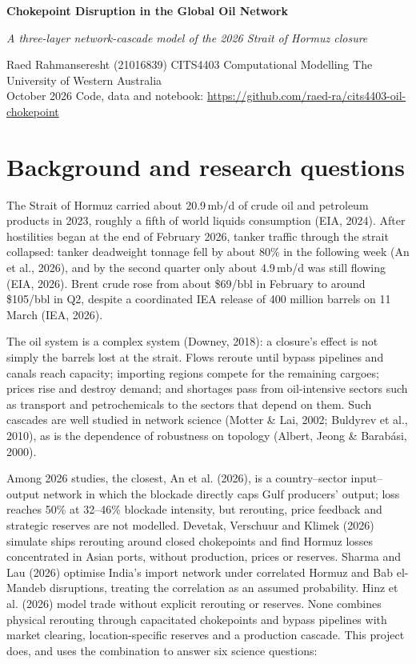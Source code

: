 \documentclass[11pt,a4paper]{article}
\begin{document}
\begin{center}
{\LARGE\bfseries Chokepoint Disruption in the Global Oil Network\par}
\vspace{2pt}
{\large\itshape A three-layer network-cascade model of the 2026 Strait of Hormuz closure\par}
\vspace{4pt}
{\small Raed Rahmanseresht (21016839) \textperiodcentered{} CITS4403 Computational Modelling \textperiodcentered{} The University of Western Australia\\
October 2026 \textperiodcentered{} Code, data and notebook: \url{https://github.com/raed-ra/cits4403-oil-chokepoint}\par}
\end{center}
\vspace{-4pt}

\section{Background and research questions}

The Strait of Hormuz carried about 20.9\,mb/d of crude oil and petroleum products in 2023, roughly a fifth of world liquids consumption (EIA, 2024). After hostilities began at the end of February 2026, tanker traffic through the strait collapsed: tanker deadweight tonnage fell by about 80\% in the following week (An et al., 2026), and by the second quarter only about 4.9\,mb/d was still flowing (EIA, 2026). Brent crude rose from about \$69/bbl in February to around \$105/bbl in Q2, despite a coordinated IEA release of 400 million barrels on 11 March (IEA, 2026).

The oil system is a complex system (Downey, 2018): a closure's effect is not simply the barrels lost at the strait. Flows reroute until bypass pipelines and canals reach capacity; importing regions compete for the remaining cargoes; prices rise and destroy demand; and shortages pass from oil-intensive sectors such as transport and petrochemicals to the sectors that depend on them. Such cascades are well studied in network science (Motter \& Lai, 2002; Buldyrev et al., 2010), as is the dependence of robustness on topology (Albert, Jeong \& Barabási, 2000).

Among 2026 studies, the closest, An et al. (2026), is a country--sector input--output network in which the blockade directly caps Gulf producers' output; loss reaches 50\% at 32--46\% blockade intensity, but rerouting, price feedback and strategic reserves are not modelled. Devetak, Verschuur and Klimek (2026) simulate ships rerouting around closed chokepoints and find Hormuz losses concentrated in Asian ports, without production, prices or reserves. Sharma and Lau (2026) optimise India's import network under correlated Hormuz and Bab el-Mandeb disruptions, treating the correlation as an assumed probability. Hinz et al. (2026) model trade without explicit rerouting or reserves. None combines physical rerouting through capacitated chokepoints and bypass pipelines with market clearing, location-specific reserves and a production cascade. This project does, and uses the combination to answer six science questions:
\end{document}
